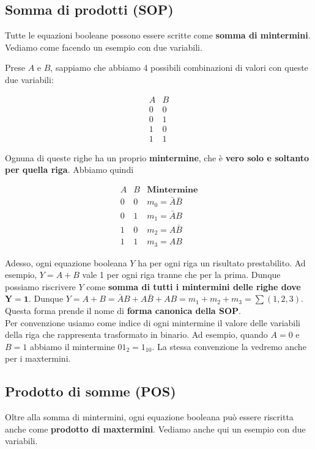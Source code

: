 \documentclass[11pt, a4paper, titlepage, oneside]{scrbook}
\begin{document}
\subsection{Somma di prodotti (SOP)}

Tutte le equazioni booleane possono essere scritte come \textbf{somma di mintermini}. Vediamo come facendo un esempio con due variabili.

Prese $A$ e $B$, sappiamo che abbiamo 4 possibili combinazioni di valori con queste due variabili:

\[
\begin{array}{cc}
A & B \\
\hline
0 & 0  \\
0 & 1  \\
1 & 0  \\
1 & 1 
\end{array}
\]

Ognuna di queste righe ha un proprio \textbf{mintermine}, che è \textbf{vero solo e soltanto per quella riga}. Abbiamo quindi

\[
\begin{array}{cc|c}
A & B & \textbf{Mintermine} \\
\hline
0 & 0 & m_0 = \bar{A} \bar{B} \\
0 & 1 & m_1 = \bar{A} B \\
1 & 0 & m_2 = A \bar{B} \\
1 & 1 & m_3 = A B
\end{array}
\]

Adesso, ogni equazione booleana $Y$ ha per ogni riga un risultato prestabilito. Ad esempio, $Y = A + B$ vale 1 per ogni riga tranne che per la prima. Dunque possiamo riscrivere $Y$ come \textbf{somma di tutti i mintermini delle righe dove} $\bm{Y = 1}$. Dunque \mbox{$Y = A + B = \bar{A} B + A \bar{B} + AB = m_1 + m_2 + m_3 = \sum(1,2,3)$}. Questa forma prende il nome di \textbf{forma canonica della SOP}. \\
\NB Per convenzione usiamo come indice di ogni mintermine il valore delle variabili della riga che rappresenta trasformato in binario. Ad esempio, quando $A = 0$ e $B = 1$ abbiamo il mintermine $01_2 = 1_{10}$. La stessa convenzione la vedremo anche per i maxtermini.

\subsection{Prodotto di somme (POS)}

Oltre alla somma di mintermini, ogni equazione booleana può essere riscritta anche come \textbf{prodotto di maxtermini}. Vediamo anche qui un esempio con due variabili.
\end{document}
